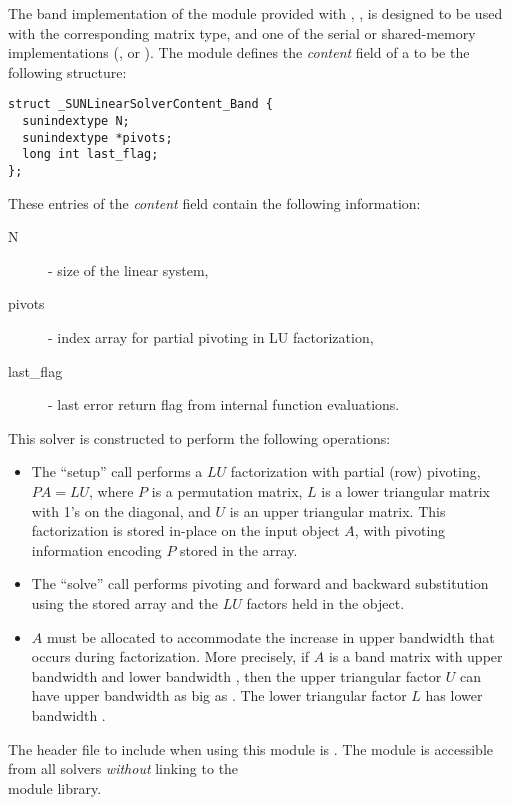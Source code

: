 
The band implementation of the {\sunlinsol} module provided with
{\sundials}, {\sunlinsolband}, is designed to be used with the
corresponding {\sunmatband} matrix type, and one of the serial or
shared-memory {\nvector} implementations ({\nvecs}, {\nvecopenmp} or
{\nvecpthreads}).  The {\sunlinsolband} module defines the {\em
content} field of a  to be the following structure:
\begin{verbatim} 
struct _SUNLinearSolverContent_Band {
  sunindextype N;
  sunindextype *pivots;
  long int last_flag;
};
\end{verbatim}
These entries of the \emph{content} field contain the following
information:
\begin{description}
  \item[N] - size of the linear system,
  \item[pivots] - index array for partial pivoting in LU factorization,
  \item[last\_flag] - last error return flag from internal function evaluations.
\end{description}

This solver is constructed to perform the following operations:
\begin{itemize}
\item The ``setup'' call performs a $LU$ factorization with
  partial (row) pivoting, $PA=LU$, where $P$ is a permutation matrix,
  $L$ is a lower triangular matrix with 1's on the diagonal, and $U$
  is an upper triangular matrix.  This factorization is stored
  in-place on the input {\sunmatband} object $A$, with pivoting
  information encoding $P$ stored in the  array.
\item The ``solve'' call performs pivoting and forward and
  backward substitution using the stored  array and the
  $LU$ factors held in the {\sunmatband} object.
\item
  {\warn} $A$ must be allocated to accommodate the increase in upper
  bandwidth that occurs during factorization.  More precisely, if $A$
  is a band matrix with upper bandwidth  and lower bandwidth
  , then the upper triangular factor $U$ can have upper
  bandwidth as big as . The lower triangular
  factor $L$ has lower bandwidth .
\end{itemize}


\noindent The header file to include when using this module 
is . The {\sunlinsolband} module
is accessible from all {\sundials} solvers \textit{without}
linking to the \\
 module library. \\

